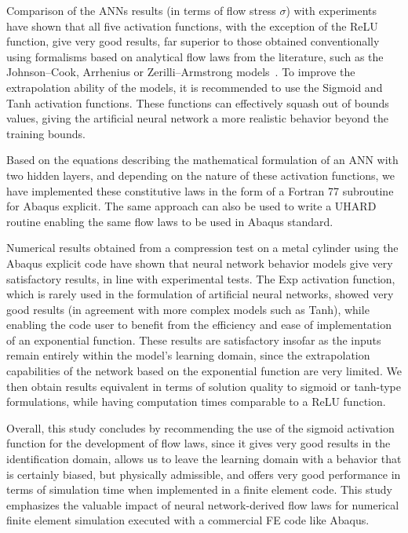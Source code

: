 \documentclass[algorithms,article,submit,pdftex,oneauthors]{Definitions/mdpi}
\begin{document}
Comparison of the ANNs results (in terms of flow stress $\sigma$) with experiments have shown that all five activation functions, with the exception of the ReLU function, give very good results, far superior to those obtained conventionally using formalisms based on analytical flow laws from the literature, such as the Johnson--Cook, Arrhenius or Zerilli--Armstrong models~\cite{Tize-2023-IEP}.
To improve the extrapolation ability of the models, it is recommended to use the Sigmoid and Tanh activation functions.
These functions can effectively squash out of bounds values, giving the artificial neural network a more realistic behavior beyond the training bounds.

Based on the equations describing the mathematical formulation of an ANN with two hidden layers, and depending on the nature of these activation functions, we have implemented these constitutive laws in the form of a Fortran 77 subroutine for Abaqus explicit.
The same approach can also be used to write a UHARD routine enabling the same flow laws to be used in Abaqus standard.

Numerical results obtained from a compression test on a metal cylinder using the Abaqus explicit code have shown that neural network behavior models give very satisfactory results, in line with experimental tests.
The Exp activation function, which is rarely used in the formulation of artificial neural networks, showed very good results (in agreement with more complex models such as Tanh), while enabling the code user to benefit from the efficiency and ease of implementation of an exponential function.
These results are satisfactory insofar as the inputs remain entirely within the model's learning domain, since the extrapolation capabilities of the network based on the exponential function are very limited.
We then obtain results equivalent in terms of solution quality to sigmoid or tanh-type formulations, while having computation times comparable to a ReLU function.

Overall, this study concludes by recommending the use of the sigmoid activation function for the development of flow laws, since it gives very good results in the identification domain, allows us to leave the learning domain with a behavior that is certainly biased, but physically admissible, and offers very good performance in terms of simulation time when implemented in a finite element code.
This study emphasizes the valuable impact of neural network-derived flow laws for numerical finite element simulation executed with a commercial FE code like Abaqus.
\end{document}
